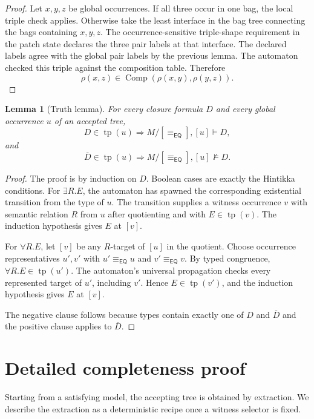 \documentclass[11pt]{article}
\newtheorem{lemma}[theorem]{Lemma}
\newcommand{\EQ}{\mathsf{EQ}}
\newcommand{\tp}{\operatorname{tp}}
\newcommand{\Comp}{\operatorname{Comp}}
\begin{document}
\begin{proof}
Let $x,y,z$ be global occurrences.  If all three occur in one bag, the local triple check applies.  Otherwise take the least interface in the bag tree connecting the bags containing $x,y,z$.  The occurrence-sensitive triple-shape requirement in the patch state declares the three pair labels at that interface.  The declared labels agree with the global pair labels by the previous lemma.  The automaton checked this triple against the composition table.  Therefore
\[
  \rho(x,z)\in\Comp(\rho(x,y),\rho(y,z)).
\]
\end{proof}

\begin{lemma}[Truth lemma]
For every closure formula $D$ and every global occurrence $u$ of an accepted tree,
\[
  D\in\tp(u) \Rightarrow M/[\equiv_{\EQ}], [u]\models D,
\]
and
\[
  \overline D\in\tp(u) \Rightarrow M/[\equiv_{\EQ}], [u]\not\models D.
\]
\end{lemma}

\begin{proof}
The proof is by induction on $D$.  Boolean cases are exactly the Hintikka conditions.  For $\exists R.E$, the automaton has spawned the corresponding existential transition from the type of $u$.  The transition supplies a witness occurrence $v$ with semantic relation $R$ from $u$ after quotienting and with $E\in\tp(v)$.  The induction hypothesis gives $E$ at $[v]$.

For $\forall R.E$, let $[v]$ be any $R$-target of $[u]$ in the quotient.  Choose occurrence representatives $u',v'$ with $u'\equiv_{\EQ}u$ and $v'\equiv_{\EQ}v$.  By typed congruence, $\forall R.E\in\tp(u')$.  The automaton's universal propagation checks every represented target of $u'$, including $v'$.  Hence $E\in\tp(v')$, and the induction hypothesis gives $E$ at $[v]$.

The negative clause follows because types contain exactly one of $D$ and $\overline D$ and the positive clause applies to $\overline D$.
\end{proof}

\section{Detailed completeness proof}

Starting from a satisfying model, the accepting tree is obtained by extraction.  We describe the extraction as a deterministic recipe once a witness selector is fixed.
\end{document}
